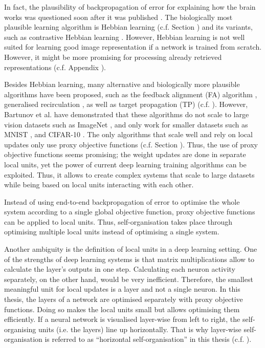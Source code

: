 In fact, the plausibility of backpropagation of error for explaining how the brain works was questioned soon after it was published .
The biologically most plausible learning algorithm is Hebbian learning (c.f. Section ) and its variants, such as contrastive Hebbian learning .
However, Hebbian learning is not well suited for learning good image representation if a network is trained from scratch. However, it might be more promising for processing already retrieved representations (c.f. Appendix ).

Besides Hebbian learning, many alternative and biologically more plausible algorithms have been proposed, such as the feedback alignment (FA) algorithm , generalised recirculation , as well as target propagation (TP)  (c.f. ).
However, Bartunov et al.  have demonstrated that these algorithms do not scale to large vision datasets such as ImageNet \cite{deng2009imagenet}, and only work for smaller datasets such as MNIST \cite{MNIST}, and CIFAR-10 \cite{cifar_10}.
The only algorithms that scale well and rely on local updates only use proxy objective functions (c.f. Section ).
Thus, the use of proxy objective functions seems promising; the weight updates are done in separate local units, yet the power of current deep learning training algorithms can be exploited. Thus, it allows to create complex systems that scale to large datasets while being based on local units interacting with each other.

\begin{implementation}
	Instead of using end-to-end backpropagation of error to optimise the whole system according to a single global objective function, proxy objective functions can be applied to local units. Thus, self-organisation takes place through optimising multiple local units instead of optimising a single system.
\end{implementation}

Another ambiguity is the definition of local units in a deep learning setting.
One of the strengths of deep learning systems is that matrix multiplications allow to calculate the layer's outputs in one step.
Calculating each neuron activity separately, on the other hand, would be very inefficient.
Therefore, the smallest meaningful unit for local updates is a layer and not a single neuron.
In this thesis, the layers of a network are optimised separately with proxy objective functions. Doing so makes the local units small but allows optimising them efficiently.
If a neural network is visualised layer-wise from left to right, the self-organising units (i.e. the layers) line up horizontally. That is why layer-wise self-organisation is referred to as ``horizontal self-organisation'' in this thesis (c.f. ).

